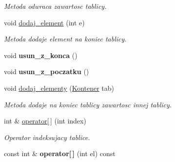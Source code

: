 \begin{DoxyCompactItemize}
\begin{DoxyCompactList}\small\item\em Metoda odwraca zawartosc tablicy. \end{DoxyCompactList}\item 
void \hyperlink{class_kontener_a94d835a8f98052790a812b367f4129e4}{dodaj\-\_\-element} (int e)
\begin{DoxyCompactList}\small\item\em Metoda dodaje element na koniec tablicy. \end{DoxyCompactList}\item 
\hypertarget{class_kontener_a568a2a699a57f6c9cd31956992e189ae}{void {\bfseries usun\-\_\-z\-\_\-konca} ()}\label{class_kontener_a568a2a699a57f6c9cd31956992e189ae}

\item 
\hypertarget{class_kontener_adf360a239fb88e0bea7adb1863e94fff}{void {\bfseries usun\-\_\-z\-\_\-poczatku} ()}\label{class_kontener_adf360a239fb88e0bea7adb1863e94fff}

\item 
void \hyperlink{class_kontener_a95a5297fde3434d3c3a2da6aa4ec69d2}{dodaj\-\_\-elementy} (\hyperlink{class_kontener}{Kontener} tab)
\begin{DoxyCompactList}\small\item\em Metoda dodaje na koniec tablicy zawartosc innej tablicy. \end{DoxyCompactList}\item 
int \& \hyperlink{class_kontener_af37b0a656738c7d444161f4dad57b8cf}{operator\mbox{[}$\,$\mbox{]}} (int index)
\begin{DoxyCompactList}\small\item\em Operator indeksujacy tablice. \end{DoxyCompactList}\item 
\hypertarget{class_kontener_a59ea73a194b2804155e477403154553b}{const int \& {\bfseries operator\mbox{[}$\,$\mbox{]}} (int el) const }\label{class_kontener_a59ea73a194b2804155e477403154553b}


\end{DoxyCompactItemize}
